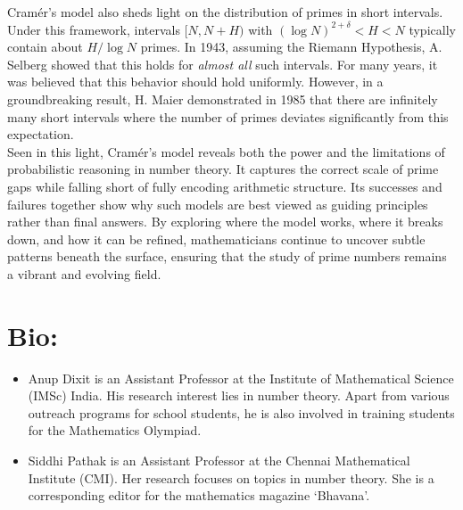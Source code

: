 \documentclass[11pt, reqno]{article}
\begin{document}
Cram\'er’s model also sheds light on the distribution of primes in short intervals. Under this framework, intervals $[N,N+H)$ with $(\log N)^{2+\delta}<H<N$ typically contain about $H/\log N$ primes. In 1943, assuming the Riemann Hypothesis, A. Selberg showed that this holds for \emph{almost all} such intervals. For many years, it was believed that this behavior should hold uniformly. However, in a groundbreaking result, H. Maier demonstrated in 1985 that there are infinitely many short intervals where the number of primes deviates significantly from this expectation. \\

Seen in this light, Cram\'er’s model reveals both the power and the limitations of probabilistic reasoning in number theory. It captures the correct scale of prime gaps while falling short of fully encoding arithmetic structure. Its successes and failures together show why such models are best viewed as guiding principles rather than final answers. By exploring where the model works, where it breaks down, and how it can be refined, mathematicians continue to uncover subtle patterns beneath the surface, ensuring that the study of prime numbers remains a vibrant and evolving field.\\

\newpage

\section*{\bf Bio:}

\begin{itemize}
    \item Anup Dixit is an Assistant Professor at the Institute of Mathematical Science (IMSc) India. His research interest lies in number theory. Apart from various outreach programs for school students, he is also involved in training students for the Mathematics Olympiad.

    \item Siddhi Pathak is an Assistant Professor at the Chennai Mathematical Institute (CMI). Her research focuses on topics in number theory. She is a corresponding editor for the mathematics magazine `Bhavana'. 
\end{itemize}
\end{document}
